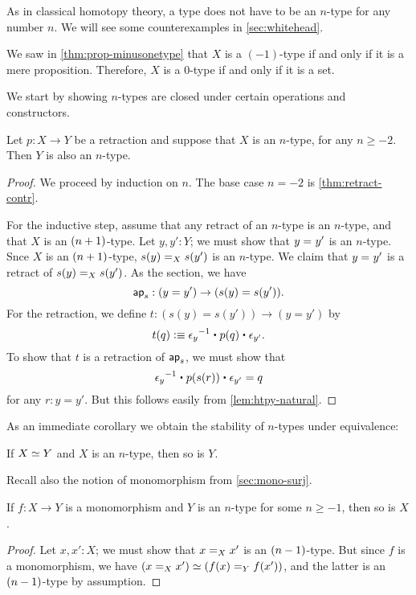 As in classical homotopy theory, a type does not have to be an $n$-type for any number $n$.
We will see some counterexamples in \autoref{sec:whitehead}.

\begin{eg}
  We saw in \autoref{thm:prop-minusonetype} that $X$ is a $(-1)$-type if and only if it is a mere proposition.
  Therefore, $X$ is a $0$-type if and only if it is a set.
\end{eg}

We start by showing $n$-types are closed under certain operations and constructors.

\begin{thm}\label{thm:h-level-retracts}
 Let $p : X \to Y$ be a retraction and suppose that $X$ is an $n$-type, for any $n\geq -2$.
 Then $Y$ is also an $n$-type.
\end{thm}

\begin{proof}
 We proceed by induction on $n$.
 The base case $n=-2$ is \autoref{thm:retract-contr}.

 For the inductive step, assume that any retract of an $n$-type is an $n$-type, and that $X$ is an $\nplusone$-type.
 Let $y, y' : Y$; we must show that $\id{y}{y'}$ is an $n$-type.
 Snce $X$ is an $\nplusone$-type, $\id[X]{s(y)}{s(y')}$ is an $n$-type.
 We claim that $\id{y}{y'}$ is a retract of $\id[X]{s(y)}{s(y')}$.
 As the section, we have
 \[ \apfunc s : (y=y') \to (s(y)=s(y')). \]
 For the retraction, we define $t:(s(y)=s(y'))\to(y=y')$ by
 \[ t(q) \defeq  \opp{\epsilon_y} \ct \ap p q \ct \epsilon_{y'}.\]
 To show that $t$ is a retraction of $\apfunc s$, we must show that
 \[ \opp{\epsilon_y} \ct \ap p {\ap sr} \ct \epsilon_{y'} = q \]
 for any $r:y=y'$.
 But this follows easily from \autoref{lem:htpy-natural}.
\end{proof}

As an immediate corollary we obtain the stability of $n$-types under equivalence:

\begin{cor}\label{cor:preservation-hlevels-weq}
 If $\eqv{X}{Y}$ and $X$ is an $n$-type, then so is $Y$.
\end{cor}

Recall also the notion of monomorphism from \autoref{sec:mono-surj}.

\begin{thm}\label{thm:isntype-mono}
  If $f:X\to Y$ is a monomorphism and $Y$ is an $n$-type for some $n\ge -1$, then so is $X$.
\end{thm}
\begin{proof}
  Let $x,x':X$; we must show that $\id[X]{x}{x'}$ is an $\nminusone$-type.
  But since $f$ is a monomorphism, we have $(\id[X]{x}{x'}) \simeq (\id[Y]{f(x)}{f(x')})$, and the latter is an $\nminusone$-type by assumption.
\end{proof}

